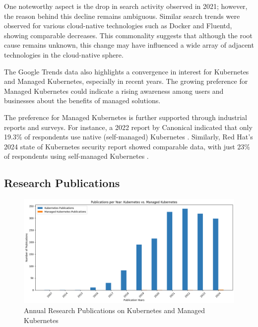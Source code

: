 One noteworthy aspect is the drop in search activity observed in 2021; however, the reason behind this decline remains ambiguous. Similar search trends were observed for various cloud-native technologies such as Docker and Fluentd, showing comparable decreases. This commonality suggests that although the root cause remains unknown, this change may have influenced a wide array of adjacent technologies in the cloud-native sphere.

The Google Trends data also highlights a convergence in interest for Kubernetes and Managed Kubernetes, especially in recent years. The growing preference for Managed Kubernetes could indicate a rising awareness among users and businesses about the benefits of managed solutions.

The preference for Managed Kubernetes is further supported through industrial reports and surveys. For instance, a 2022 report by Canonical indicated that only 19.3\% of respondents use native (self-managed) Kubernetes \cite{canonical_kubernetes_2022}. Similarly, Red Hat's 2024 state of Kubernetes security report showed comparable data, with just 23\% of respondents using self-managed Kubernetes \cite{red_hat_inc_state_2024}.

\subsection{Research Publications}

\FloatBarrier

\begin{figure}
    \centering
    \includegraphics[width=1\linewidth]{resources/55ccf3419c03248ff5a2383d4ae63366.png}
    \caption{Annual Research Publications on Kubernetes and Managed Kubernetes}
    \label{fig:research-publications-kubernetes-and-managed-kubernetes}
\end{figure}


